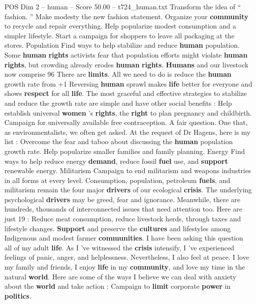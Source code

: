 \begin{textsample}{POS Dim 2 – human – Score 50.00 – t724\_human.txt}
Transform the idea of “ fashion. ” Make modesty the new fashion statement.
Organize your \textbf{community} to recycle and repair everything.
Help popularize modest consumption and a simpler lifestyle.
Start a campaign for shoppers to leave all packaging at the stores.
Population Find ways to help stabilize and reduce \textbf{human} population.
Some \textbf{human} \textbf{rights} activists fear that population efforts might violate \textbf{human} \textbf{rights}, but crowding already erodes \textbf{human} \textbf{rights}. \textbf{Humans} and our livestock now comprise 96 %
There are \textbf{limits}.
All we need to do is reduce the \textbf{human} growth rate from +1 %
Reversing \textbf{human} sprawl makes \textbf{life} better for everyone and shows \textbf{respect} for all \textbf{life}.
The most graceful and effective strategies to stabilize and reduce the growth rate are simple and have other social benefits : Help establish universal \textbf{women} ’s \textbf{rights}, the \textbf{right} to plan pregnancy and childbirth.
Campaign for universally available free contraception.
A fair question.
One that, as environmentalists, we often get asked.
At the request of Dr Hagens, here is my list : Overcome the fear and taboo about discussing the \textbf{human} population growth rate.
Help popularize smaller families and family planning.
Energy Find ways to help reduce energy \textbf{demand}, reduce fossil \textbf{fuel} use, and \textbf{support} renewable energy.
Militarism Campaign to end militarism and weapons industries in all forms at every level.
Consumption, population, petroleum \textbf{fuels}, and militarism remain the four major \textbf{drivers} of our ecological \textbf{crisis}.
The underlying psychological \textbf{drivers} may be greed, fear and ignorance.
Meanwhile, there are hundreds, thousands of interconnected issues that need attention too.
Here are just 19 : Reduce meat consumption, reduce livestock herds, through taxes and lifestyle changes. \textbf{Support} and preserve the \textbf{cultures} and lifestyles among Indigenous and modest farmer \textbf{communities}.
I have been asking this question all of my adult \textbf{life}.
As I ’ve witnessed the \textbf{crisis} intensify, I ’ve experienced feelings of panic, anger, and helplessness.
Nevertheless, I also feel at peace.
I love my family and friends, I enjoy \textbf{life} in my \textbf{community}, and love my time in the natural \textbf{world}.
Here are some of the ways I believe we can deal with anxiety about the \textbf{world} and take action : Campaign to \textbf{limit} corporate \textbf{power} in \textbf{politics}.

\end{textsample}
